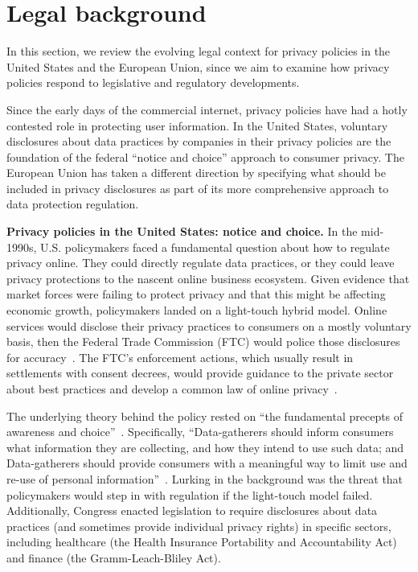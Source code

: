 {\section{Legal background}
\label{sec:ppot:background}

In this section, we review the evolving legal context for privacy policies in the United States and the European Union, since we aim to examine how privacy policies respond to legislative and regulatory developments. 

Since the early days of the commercial internet, privacy policies have had a hotly contested role in protecting user information. In the United States, voluntary disclosures about data practices by companies in their privacy policies are the foundation of the federal ``notice and choice'' approach to consumer privacy. The European Union has taken a different direction by specifying what should be included in privacy disclosures as part of its more comprehensive approach to data protection regulation. 

\textbf{Privacy policies in the United States: notice and choice.} In the mid-1990s, U.S. policymakers faced a fundamental question about how to regulate privacy online. They could directly regulate data practices, or they could leave privacy protections to the nascent online business ecosystem. Given evidence that market forces were failing to protect privacy and that this might be affecting economic growth, policymakers landed on a light-touch hybrid model. Online services would disclose their privacy practices to consumers on a mostly voluntary basis, then the Federal Trade Commission (FTC) would police those disclosures for accuracy~\cite{swire1997markets}. The FTC’s enforcement actions, which usually result in settlements with consent decrees, would provide guidance to the private sector about best practices and develop a common law of online privacy~\cite{solove2014ftc}.

The underlying theory behind the policy rested on ``the fundamental precepts of awareness and choice''~\cite{united1997framework}. Specifically, ``Data-gatherers should inform consumers what information they are collecting, and how they intend to use such data; and Data-gatherers should provide consumers with a meaningful way to limit use and re-use of personal information''~\cite{united1997framework}. Lurking in the background was the threat that policymakers would step in with regulation if the light-touch model failed. Additionally, Congress enacted legislation to require disclosures about data practices (and sometimes provide individual privacy rights) in specific sectors, including healthcare (the Health Insurance Portability and Accountability Act) and finance (the Gramm-Leach-Bliley Act).

}
